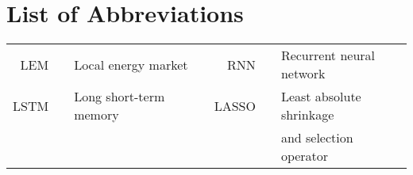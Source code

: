 \section*{List of Abbreviations}

\begin{tabular}{rp{0.2cm}lp{1cm}rp{0.2cm}l}
    LEM     & &  Local energy market         & & RNN     & &  Recurrent neural network  \\
    LSTM    & &  Long short-term memory      & & LASSO   & &  Least absolute shrinkage \\
            & &                               & &         & &  and selection operator
\end{tabular}
